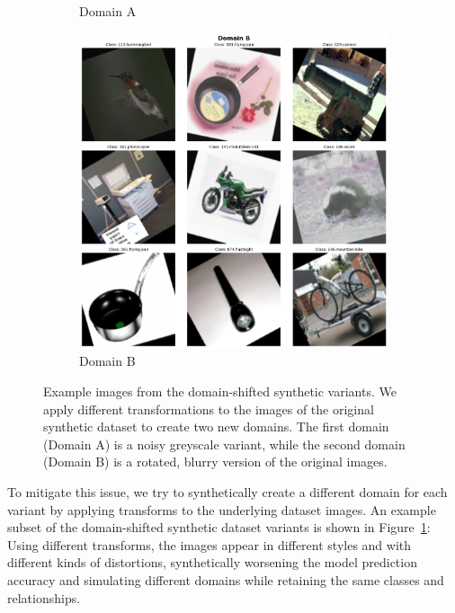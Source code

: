 \begin{figure}[ht]
\begin{subfigure}[b]{0.4\textwidth}
            \caption{Domain A}
      \end{subfigure}
      \hfill
      \begin{subfigure}[b]{0.4\textwidth}
            \centering
            \includegraphics[width=\textwidth]{figures/domain_shift_3.png}
            \caption{Domain B}
      \end{subfigure}

      \caption{Example images from the domain-shifted synthetic variants.
            We apply different transformations to the images of the original synthetic dataset
            to create two new domains. The first domain (Domain A) is a noisy greyscale variant,
            while the second domain (Domain B) is a rotated, blurry version of the original images.}
      \label{fig:domain_shift}
\end{figure}

To mitigate this issue, we try to synthetically create a different domain for each variant by applying transforms to the
underlying dataset images.
An example subset of the domain-shifted synthetic dataset variants is shown in Figure~\ref{fig:domain_shift}:
Using different transforms, the images appear in different styles and with different kinds of distortions,
synthetically worsening the model prediction accuracy and simulating different domains
while retaining the same classes and relationships.

